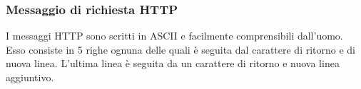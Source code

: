 \documentclass{book}
\begin{document}
\subsubsection{Messaggio di richiesta HTTP}

{}

I messaggi HTTP sono scritti in ASCII e facilmente comprensibili dall'uomo.
Esso consiste in 5 righe ognuna delle quali {\`e} seguita dal carattere di
ritorno e di nuova linea. L'ultima linea {\`e} seguita da un carattere di
ritorno e nuova linea aggiuntivo.
\end{document}
